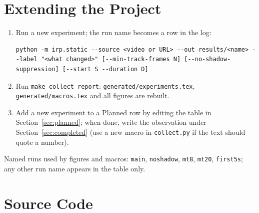 \documentclass[11pt,a4paper]{article}
\begin{document}
\appendix
\section{Extending the Project}
\begin{enumerate}
\item Run a new experiment; the run name becomes a row in the log:
\begin{lstlisting}[language={},numbers=none,basicstyle=\ttfamily\footnotesize]
python -m irp.static --source <video or URL> --out results/<name> --label "<what changed>" [--min-track-frames N] [--no-shadow-suppression] [--start S --duration D]
\end{lstlisting}
\item Run \texttt{make collect report}: \texttt{generated/experiments.tex}, \texttt{generated/macros.tex} and all figures are rebuilt.
\item Add a new experiment to a Planned row by editing the table in Section~\ref{sec:planned}; when done, write the observation under Section~\ref{sec:completed}
(use a new macro in \texttt{collect.py} if the text should quote a number).
\end{enumerate}
Named runs used by figures and macros: \texttt{main}, \texttt{noshadow}, \texttt{mt8}, \texttt{mt20}, \texttt{first5s}; any other run name appears in the table only.

\section{Source Code}\label{app:code}



















\end{document}
